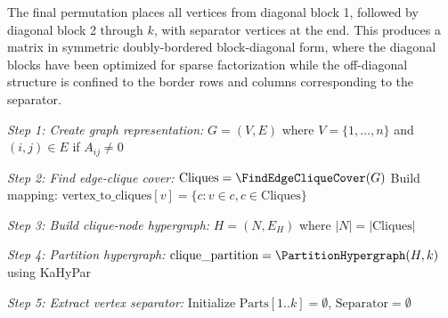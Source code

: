The final permutation places all vertices from diagonal block 1, followed by diagonal block 2 through $k$, with separator vertices at the end. This produces a matrix in symmetric doubly-bordered block-diagonal form, where the diagonal blocks have been optimized for sparse factorization while the off-diagonal structure is confined to the border rows and columns corresponding to the separator.

\begin{algorithm}[H]

    \BlankLine

    \emph{Step 1: Create graph representation:}\;
    $G = (V, E)$ where $V = \{1, \ldots, n\}$ and $(i,j) \in E$ if $A_{ij} \neq 0$\;
    \BlankLine

    \emph{Step 2: Find edge-clique cover:}\;
    $\text{Cliques} = \FindEdgeCliqueCover(G)$\;
    Build mapping: $\text{vertex\_to\_cliques}[v] = \{c : v \in c, c \in \text{Cliques}\}$\;
    \BlankLine

    \emph{Step 3: Build clique-node hypergraph:}\;
    $H = (N, E_H)$ where $|N| = |\text{Cliques}|$\;
    \BlankLine

    \emph{Step 4: Partition hypergraph:}\;
    $\text{clique\_partition} = \PartitionHypergraph(H, k)$ using KaHyPar\;
    \BlankLine

    \emph{Step 5: Extract vertex separator:}\;
    Initialize $\text{Parts}[1..k] = \emptyset$, $\text{Separator} = \emptyset$\;
    \BlankLine


\end{algorithm}
